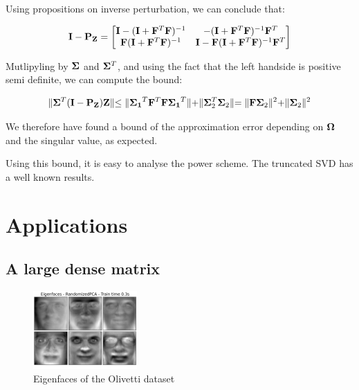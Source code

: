 \documentclass[onecolumn,12pt]{article}
\begin{document}
Using propositions on inverse perturbation, we can conclude that:

\begin{equation}
\bold{I} - \bold{P_Z} = 
    \begin{bmatrix}
    \bold{I} - (\bold{I} + \bold{F}^T \bold{F})^{-1} & - (\bold{I} +
    \bold{F}^T \bold{F})^{-1}\bold{F}^T \\
    \bold{F}(\bold{I} + \bold{F}^T \bold{F})^{-1}  & \bold{I} -
    \bold{F}(\bold{I} + \bold{F}^T \bold{F})^{-1} \bold{F}^T
    \end{bmatrix}
\end{equation}

Mutlipyling by $\bold{\Sigma}$ and $\bold{\Sigma}^T$, and using the fact that
the left handside is positive semi definite, we can compute the bound:

\begin{equation}
\lVert \bold{\Sigma}^T (\bold{I} - \bold{P_Z}) \bold{Z} \lVert \leq
\lVert \bold{\Sigma_1}^T \bold{F}^T \bold{F} \bold{\Sigma_1}^T\lVert +
\lVert \bold{\Sigma}_2^T \bold{\Sigma}_2 \lVert  =
\lVert \bold{F} \bold{\Sigma}_ 2\lVert^2 + \lVert \bold{\Sigma}_2 \lVert^2
\end{equation}

We therefore have found a bound of the approximation error depending on
$\bold{\Omega}$ and the singular value, as expected.

Using this bound, it is easy to analyse the power scheme. The truncated SVD
has a well known results.

\section{Applications}
\subsection{A large dense matrix}
\begin{figure}[h]
\label{eigenfaces}
\caption{Eigenfaces of the Olivetti dataset}
\includegraphics[width=150px]{./images/plot_faces_decomposition_2.png}
\end{figure}
\end{document}

